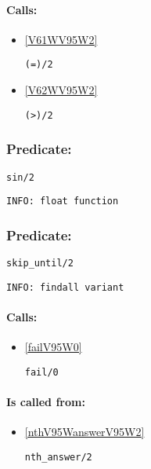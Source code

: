\paragraph{Calls:} 
\begin{itemize}
\item \ref{V61WV95W2} 
\begin{verbatim}
(=)/2
\end{verbatim}

\item \ref{V62WV95W2} 
\begin{verbatim}
(>)/2
\end{verbatim}

\end{itemize}

\subsubsection{Predicate:} \label{sinV95W2}

\begin{verbatim}
sin/2
\end{verbatim}

{\small \begin{verbatim}
INFO: float function

\end{verbatim}}

\subsubsection{Predicate:} \label{skipV95WuntilV95W2}

\begin{verbatim}
skip_until/2
\end{verbatim}

{\small \begin{verbatim}
INFO: findall variant

\end{verbatim}}
\paragraph{Calls:} 
\begin{itemize}
\item \ref{failV95W0} 
\begin{verbatim}
fail/0
\end{verbatim}

\end{itemize}
\paragraph{Is called from:} 
\begin{itemize}
\item \ref{nthV95WanswerV95W2} 
\begin{verbatim}
nth_answer/2
\end{verbatim}

\end{itemize}

